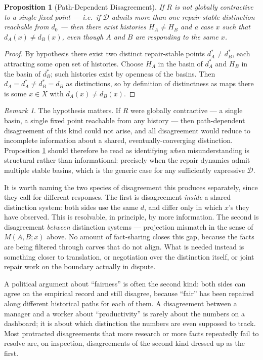 \documentclass[11pt]{article}
\theoremstyle{plain}
\newtheorem{proposition}[theorem]{Proposition}
\theoremstyle{definition}
\theoremstyle{remark}
\newtheorem{remark}[theorem]{Remark}
\begin{document}
\begin{proposition}[Path-Dependent Disagreement]
\label{prop:disagreement}
If $R$ is not globally contractive to a single fixed point --- i.e.\ if $\mathcal{D}$ admits more than one repair-stable distinction reachable from $d_0$ --- then there exist histories $H_A \ne H_B$ and a case $x$ such that $d_A(x) \ne d_B(x)$, even though $A$ and $B$ are responding to the same $x$.
\end{proposition}

\begin{proof}
By hypothesis there exist two distinct repair-stable points $d_A^\ast \ne d_B^\ast$, each attracting some open set of histories. Choose $H_A$ in the basin of $d_A^\ast$ and $H_B$ in the basin of $d_B^\ast$; such histories exist by openness of the basins. Then $d_A = d_A^\ast \ne d_B^\ast = d_B$ as distinctions, so by definition of distinctness as maps there is some $x \in X$ with $d_A(x) \ne d_B(x)$.
\end{proof}

\begin{remark}
The hypothesis matters. If $R$ were globally contractive --- a single basin, a single fixed point reachable from any history --- then path-dependent disagreement of this kind could not arise, and all disagreement would reduce to incomplete information about a shared, eventually-converging distinction. Proposition \ref{prop:disagreement} should therefore be read as identifying \emph{when} misunderstanding is structural rather than informational: precisely when the repair dynamics admit multiple stable basins, which is the generic case for any sufficiently expressive $\mathcal{D}$.
\end{remark}

It is worth naming the two species of disagreement this produces separately, since they call for different responses. The first is disagreement \emph{inside} a shared distinction system: both sides use the same $d$, and differ only in which $x$'s they have observed. This is resolvable, in principle, by more information. The second is disagreement \emph{between} distinction systems --- projection mismatch in the sense of $M(A,B;x)$ above. No amount of fact-sharing closes this gap, because the facts are being filtered through carves that do not align. What is needed instead is something closer to translation, or negotiation over the distinction itself, or joint repair work on the boundary actually in dispute.

A political argument about ``fairness'' is often the second kind: both sides can agree on the empirical record and still disagree, because ``fair'' has been repaired along different historical paths for each of them. A disagreement between a manager and a worker about ``productivity'' is rarely about the numbers on a dashboard; it is about which distinction the numbers are even supposed to track. Most protracted disagreements that more research or more facts repeatedly fail to resolve are, on inspection, disagreements of the second kind dressed up as the first.
\end{document}
